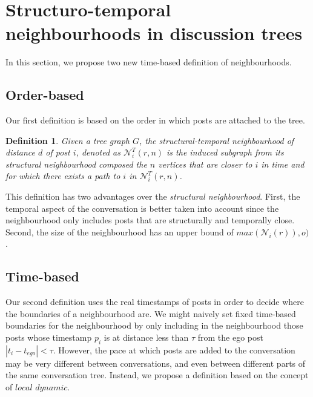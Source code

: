 \documentclass[conference]{IEEEtran}
\newtheorem{definition}{Definition}
\begin{document}
\section{Structuro-temporal neighbourhoods in discussion trees}
In this section, we propose two new time-based definition of neighbourhoods.

\subsection{Order-based}
Our first definition is based on the order in which posts are attached to the tree. 
\begin{definition}
Given a tree graph $G$, the \textit{structural-temporal neighbourhood} of distance $d$ of post $i$, denoted as $\mathcal{N}_{i}^T(r,n)$ is the induced subgraph from its structural neighbourhood composed the $n$ vertices that are closer to $i$ in time and for which there exists a path to $i$ in $\mathcal{N}_{i}^T(r,n)$.  
\end{definition}

This definition has two advantages over the \textit{structural neighbourhood}. First, the temporal aspect of the conversation is better taken into account since the neighbourhood only includes posts that are structurally and temporally close. Second, the size of the neighbourhood has an upper bound of $max(\mathcal{N}_i(r)), o)$.

\subsection{Time-based}
Our second definition uses the real timestamps of posts in order to decide where the boundaries of a neighbourhood are. We might naively set fixed time-based boundaries for the neighbourhood by only including in the neighbourhood those posts whose timestamp $p_i$ is at distance less than $\tau$ from the ego post $|t_i-t_{ego}|<\tau$. However, the pace at which posts are added to the conversation may be very different between conversations, and even between different parts of the same conversation tree. Instead, we propose a definition based on the concept of $\textit{local dynamic}$. 
\end{document}
